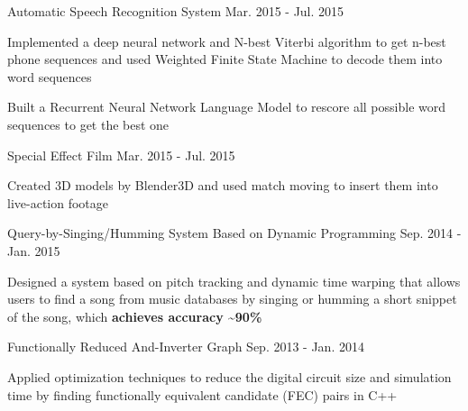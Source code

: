 


\begin{cventries}


\cventrytwo
{Automatic Speech Recognition System {}} %
{Mar. 2015 -  Jul. 2015} %
{ %
\begin{cvitems}
\item {Implemented a deep neural network and N-best Viterbi algorithm to get n-best phone sequences and used Weighted Finite State Machine to decode them into word sequences}
\item {Built a Recurrent Neural Network Language Model to rescore all possible word sequences to get the best one}
\end{cvitems}
}

\cventrytwo
{Special Effect Film {}} %
{Mar. 2015 -  Jul. 2015} %
{ %
\begin{cvitems}
\item {Created 3D models by Blender3D and used match moving to insert them into live-action footage}
\end{cvitems}
}

\cventrytwo
{Query-by-Singing/Humming System Based on Dynamic Programming {}} %
{Sep. 2014 -  Jan. 2015} %
{ %
\begin{cvitems}
\item {Designed a system based on pitch tracking and dynamic time warping that allows users to find a song from music databases by singing or humming a short snippet of the song, which \textbf{achieves accuracy \textasciitilde90\%}}
\end{cvitems}
}

\cventrytwo
{Functionally Reduced And-Inverter Graph {}} %
{Sep. 2013 -  Jan. 2014} %
{ %
\begin{cvitems}
\item {Applied optimization techniques to reduce the digital circuit size and simulation time
by finding functionally equivalent candidate (FEC) pairs in C++}
\end{cvitems}
}

\end{cventries}